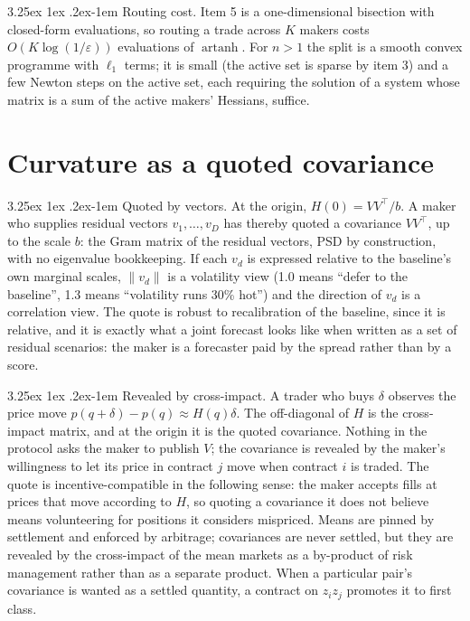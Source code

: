\documentclass[11pt]{article}
\makeatletter
\renewcommand\paragraph{\@startsection{paragraph}{4}{\z@}%
  {3.25ex \@plus1ex \@minus.2ex}{-1em}%
  {\normalfont\normalsize\itshape}}
\theoremstyle{definition}
\theoremstyle{remark}
\newcommand{\artanh}{\operatorname{artanh}}
\makeatother
\begin{document}
\paragraph{Routing cost.} Item 5 is a one-dimensional bisection with closed-form evaluations, so routing a trade
across $K$ makers costs $O(K\log(1/\varepsilon))$ evaluations of $\artanh$. For $n>1$ the split is a smooth convex
programme with $\ell_1$ terms; it is small (the active set is sparse by item 3) and a few Newton steps on the
active set, each requiring the solution of a system whose matrix is a sum of the active makers' Hessians, suffice.

\section{Curvature as a quoted covariance}\label{sec:curvature}

\paragraph{Quoted by vectors.} At the origin, $H(0)=VV^{\top}/b$. A maker who supplies residual vectors
$v_1,\dots,v_D$ has thereby quoted a covariance $VV^{\top}$, up to the scale $b$: the Gram matrix of the residual
vectors, PSD by construction, with no eigenvalue bookkeeping. If each $v_d$ is expressed relative to the baseline's
own marginal scales, $\|v_d\|$ is a volatility view (1.0 means ``defer to the baseline'', 1.3 means ``volatility
runs 30\% hot'') and the direction of $v_d$ is a correlation view. The quote is robust to recalibration of the
baseline, since it is relative, and it is exactly what a joint forecast looks like when written as a set of
residual scenarios: the maker is a forecaster paid by the spread rather than by a score.

\paragraph{Revealed by cross-impact.} A trader who buys $\delta$ observes the price move $p(q+\delta)-p(q)\approx
H(q)\delta$. The off-diagonal of $H$ is the cross-impact matrix, and at the origin it is the quoted covariance. Nothing
in the protocol asks the maker to publish $V$; the covariance is revealed by the maker's willingness to let its
price in contract $j$ move when contract $i$ is traded. The quote is incentive-compatible in the following sense: the
maker accepts fills at prices that move according to $H$, so quoting a covariance it does not believe means
volunteering for positions it considers mispriced. Means are pinned by settlement and enforced by arbitrage;
covariances are never settled, but they are revealed by the cross-impact of the mean markets as a by-product of risk
management rather than as a separate product. When a particular pair's covariance is wanted as a settled quantity, a contract on
$z_iz_j$ promotes it to first class.
\end{document}
